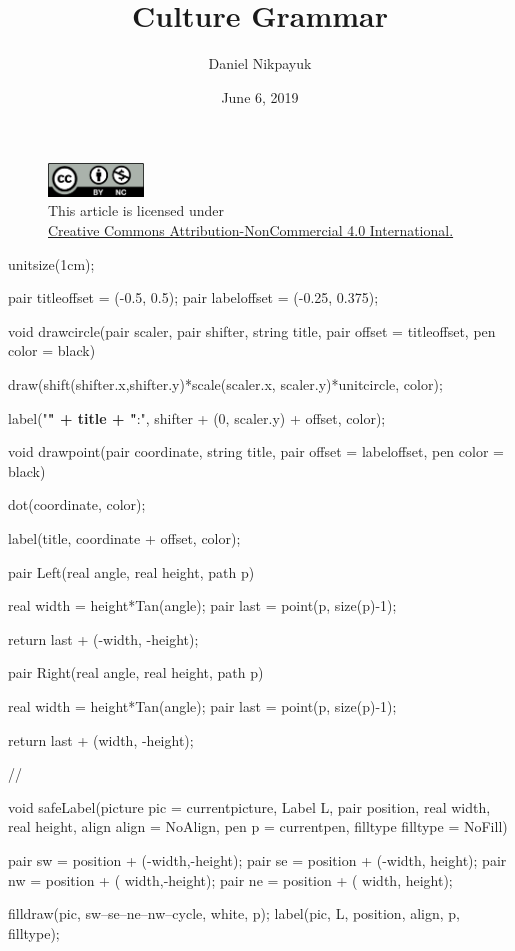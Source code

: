 \documentclass[twoside]{article}
\title{Culture Grammar}
\author{Daniel Nikpayuk}
\date{June 6, 2019}
\begin{document}
\maketitle
\thispagestyle{empty}

\begin{figure}[h]
\centering
\includegraphics[width=1in]{cc-by-nc.png}\\[0.1in]
\tiny This article is licensed under \\
\href{http://creativecommons.org/licenses/by-nc/4.0/}
{Creative Commons Attribution-NonCommercial 4.0 International.}\\[0.3in]
\end{figure}

\begin{asydef}
unitsize(1cm);

pair titleoffset = (-0.5, 0.5);
pair labeloffset = (-0.25, 0.375);

void drawcircle(pair scaler, pair shifter, string title, pair offset = titleoffset, pen color = black)
{
	draw(shift(shifter.x,shifter.y)*scale(scaler.x, scaler.y)*unitcircle, color);

	label("{\bfseries " + title + "}:", shifter + (0, scaler.y) + offset, color);
}

void drawpoint(pair coordinate, string title, pair offset = labeloffset, pen color = black)
{
	dot(coordinate, color);

	label(title, coordinate + offset, color);
}

pair Left(real angle, real height, path p)
{
	real width = height*Tan(angle);
	pair last  = point(p, size(p)-1);

	return last + (-width, -height);
}

pair Right(real angle, real height, path p)
{
	real width = height*Tan(angle);
	pair last  = point(p, size(p)-1);

	return last + (width, -height);
}

//

void safeLabel(picture pic = currentpicture, Label L, pair position, real width, real height,
		align align = NoAlign, pen p = currentpen, filltype filltype = NoFill)
{
	pair sw = position + (-width,-height);
	pair se = position + (-width, height);
	pair nw = position + ( width,-height);
	pair ne = position + ( width, height);

	filldraw(pic, sw--se--ne--nw--cycle, white, p);
	label(pic, L, position, align, p, filltype);
}

\end{asydef}
\end{document}
